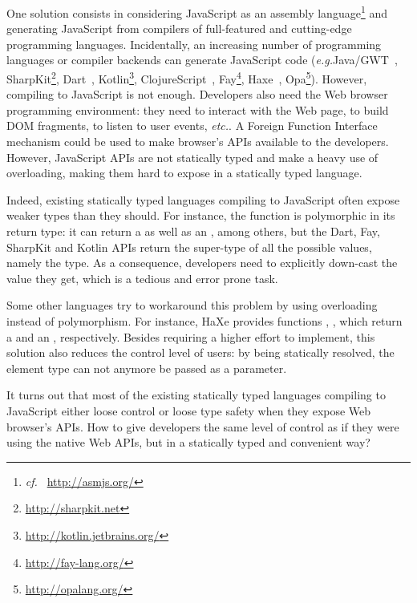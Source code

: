 \documentclass[runningheads,a4paper]{llncs}
\newcommand{\eg}{\emph{e.g.}}
\newcommand{\cf}{\emph{cf.~}}
\newcommand{\etc}{\emph{etc.}}
\begin{document}
One solution consists in considering JavaScript as an assembly language\footnote{\cf
\href{http://asmjs.org/}{http://asmjs.org/}} and generating JavaScript from compilers of full-featured and
cutting-edge programming languages. Incidentally, an increasing number of programming languages or compiler backends
can generate JavaScript code (\eg Java/GWT~\cite{Chaganti07_GWT},
SharpKit\footnote{\href{http://sharpkit.net}{http://sharpkit.net}}, Dart~\cite{Griffith11_Dart},
Kotlin\footnote{\href{http://kotlin.jetbrains.org/}{http://kotlin.jetbrains.org/}},
ClojureScript~\cite{McGranaghan11_ClojureScript}, Fay\footnote{\href{http://fay-lang.org/}{http://fay-lang.org/}},
Haxe~\cite{Cannasse08_HaXe}, Opa\footnote{\href{http://opalang.org/}{http://opalang.org/}}). 
However, compiling to JavaScript is not enough. Developers also need the Web browser programming environment: they
need to interact with the Web page, to build DOM fragments, to listen to user events, \etc. A Foreign Function
Interface mechanism could be used to make browser’s APIs available to the developers. However, JavaScript APIs are
not statically typed and make a heavy use of overloading, making them hard to expose in a statically typed language.

Indeed, existing statically typed languages compiling to JavaScript often expose weaker types than they should. For
instance, the function  is polymorphic in its return type: it can return a  as
well as an , among others, but the Dart, Fay, SharpKit and Kotlin APIs return the super-type of
all the possible values, namely the  type. As a consequence, developers need to explicitly down-cast
the value they get, which is a tedious and error prone task.

Some other languages try to workaround this problem by using overloading instead of polymorphism. For instance, HaXe
provides functions , , which return a  and an
, respectively. Besides requiring a higher effort to implement, this solution also reduces the
control level of users: by being statically resolved, the element type can not anymore be passed as a parameter.

It turns out that most of the existing statically typed languages compiling to JavaScript either loose control or
loose type safety when they expose Web browser’s APIs. How to give developers the same level of control as if they
were using the native Web APIs, but in a statically typed and convenient way?
\end{document}
